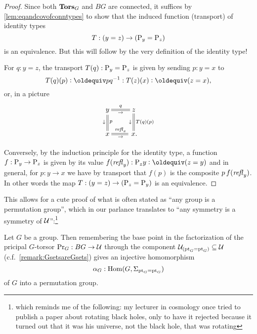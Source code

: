 \begin{proof}
  Since both $\mathbf{Tors}_G$ and $BG$ are connected, it suffices by \cref{lem:eqandcovofconntypes} to show that the induced function (\ie transport) of identity types
$$T:(y=z)\to(\mathrm{P}_{y}= \mathrm{P}_{z})
$$
is an equivalence.  But this will follow by the very definition of the identity type!  

For $q:y=z$,  the transport $T(q):\mathrm{P}_{y}=\mathrm{P}_{z}$ is given by  sending $p:y=x$ to
$$T(q)(p)\defequi pq^{-1}:T(z)(x)\defequi(z=x),$$ 
or, in a picture 
$$\xymatrix{y\ar@{=}[r]^q_\to\ar@{=}[d]^{p}_\downarrow&z\ar@{=}[d]^{T(q)(p)}_\downarrow\\
x\ar@{=}[r]^{\refl x}_\to&\,x.}$$


Conversely, by the induction principle for the identity type, %
a function $f:\mathrm{P}_{y}\to \mathrm{P}_{z}$ is given by its value $f(\refl y):\pathsp zy\defequi (z=y)$ and in general, for $p:y\to x$ we have by transport that $f(p)$ is the composite $p\,f(\mathop{{\it refl}_{y}})$.  In other words the map $T:(y=z)\to(\mathrm{P}_{z}=\mathrm{P}_{y})$ is an equivalence.
\end{proof}
This allows for a cute proof of what is often stated as ``any group is a permutation group'', which in our parlance translates to ``any symmetry is a symmetry of $\mathcal{U}$'':\footnote{which reminds me of the following: my lecturer in cosmology once tried to publish a paper about rotating black holes, only to have it rejected because it turned out that it was his universe, not the black hole, that was rotating}
\begin{lemma}
  \label{lem:allgpsarepermutationgps}Let $G$ be a group.  Then remembering the base point in the factorization of the pricipal $G$-torsor $\mathrm{Pr}_{{G}}:BG\to\mathcal{U}$ through the component $\mathcal{U}_{({\mathord{\mathrm{pt}}}_G={\mathord{\mathrm{pt}}}_G)}\subseteq\mathcal{U}$ (c.f.~\cref{remark:GsetsareGsets}) gives an injective homomorphism
$$\alpha_G:\mathrm{Hom}(G,\Sigma_{{\mathord{\mathrm{pt}}}_G={\mathord{\mathrm{pt}}}_G})$$  
of $G$ into a permutation group.
\end{lemma}
